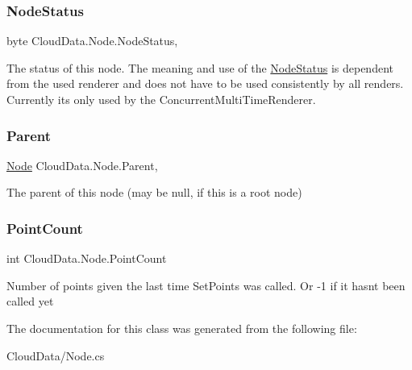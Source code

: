 \subsubsection{\texorpdfstring{Node\+Status}{NodeStatus}}
{\footnotesize\ttfamily byte Cloud\+Data.\+Node.\+Node\+Status\hspace{0.3cm}{\ttfamily [get]}, {\ttfamily [set]}}



The status of this node. The meaning and use of the \hyperlink{class_cloud_data_1_1_node_status}{Node\+Status} is dependent from the used renderer and does not have to be used consistently by all renders. Currently its only used by the Concurrent\+Multi\+Time\+Renderer. 

\mbox{\label{class_cloud_data_1_1_node_ae7600b8769acc09e7d3a6d4a5382fed8}} 
\subsubsection{\texorpdfstring{Parent}{Parent}}
{\footnotesize\ttfamily \hyperlink{class_cloud_data_1_1_node}{Node} Cloud\+Data.\+Node.\+Parent\hspace{0.3cm}{\ttfamily [get]}, {\ttfamily [set]}}



The parent of this node (may be null, if this is a root node) 

\mbox{\label{class_cloud_data_1_1_node_a5d9df7ed9ea8c45472d032591e7ea99c}} 
\subsubsection{\texorpdfstring{Point\+Count}{PointCount}}
{\footnotesize\ttfamily int Cloud\+Data.\+Node.\+Point\+Count\hspace{0.3cm}{\ttfamily [get]}}



Number of points given the last time Set\+Points was called. Or -\/1 if it hasn\textquotesingle{}t been called yet 



The documentation for this class was generated from the following file\+:\begin{DoxyCompactItemize}
\item 
Cloud\+Data/Node.\+cs\end{DoxyCompactItemize}
